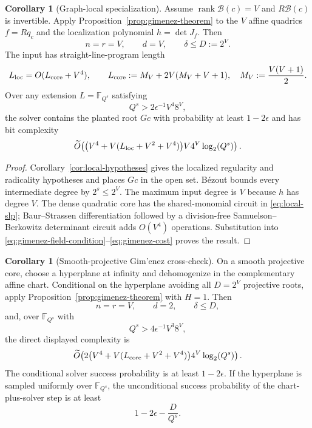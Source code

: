 \documentclass[11pt,a4paper]{article}
\theoremstyle{definition}
\newtheorem{corollary}[theorem]{Corollary}
\theoremstyle{remark}
\newcommand{\F}{\mathbb F}
\newcommand{\rank}{\operatorname{rank}}
\begin{document}
\begin{corollary}[Graph-local specialization]\label{cor:gimenez-local}
Assume $\rank\mathcal B(c)=V$ and $R\mathcal B(c)$ is invertible.  Apply Proposition~\ref{prop:gimenez-theorem} to the $V$ affine quadrics $f=Rq_c$ and the localization polynomial $h=\det J_f$.  Then
\[
 n=r=V,\qquad d=V,\qquad \delta\le D:=2^V.
\]
The input has straight-line-program length
\begin{equation}\label{eq:local-slp}
 L_{\rm loc}=O(L_{\rm core}+V^4),
 \qquad
 L_{\rm core}:=M_V+2V(M_V+V+1),
 \quad M_V:=\frac{V(V+1)}2.
\end{equation}
Over any extension $L=\F_{Q^s}$ satisfying
\begin{equation}\label{eq:local-field-condition}
 Q^s>2\epsilon^{-1}V^4 8^V,
\end{equation}
the solver contains the planted root $Gc$ with probability at least $1-2\epsilon$ and has bit complexity
\begin{equation}\label{eq:local-solver-cost}
 \widetilde O\!\left(
 \bigl(V^4+V(L_{\rm loc}+V^2+V^4)\bigr)V4^V\log_2(Q^s)
 \right).
\end{equation}
\end{corollary}

\begin{proof}
Corollary~\ref{cor:local-hypotheses} gives the localized regularity and radicality hypotheses and places $Gc$ in the open set.  B\'ezout bounds every intermediate degree by $2^s\le2^V$.  The maximum input degree is $V$ because $h$ has degree $V$.  The dense quadratic core has the shared-monomial circuit in \eqref{eq:local-slp}; Baur--Strassen differentiation followed by a division-free Samuelson--Berkowitz determinant circuit adds $O(V^4)$ operations.  Substitution into \eqref{eq:gimenez-field-condition}--\eqref{eq:gimenez-cost} proves the result.
\end{proof}

\begin{corollary}[Smooth-projective Gim'enez cross-check]\label{cor:gimenez-projective}
On a smooth projective core, choose a hyperplane at infinity and dehomogenize in the complementary affine chart.  Conditional on the hyperplane avoiding all $D=2^V$ projective roots, apply Proposition~\ref{prop:gimenez-theorem} with $H=1$.  Then
\[
 n=r=V,\qquad d=2,\qquad\delta\le D,
\]
and, over $\F_{Q^s}$ with
\begin{equation}\label{eq:projective-gimenez-field}
 Q^s>4\epsilon^{-1}V^3 8^V,
\end{equation}
the direct displayed complexity is
\begin{equation}\label{eq:projective-gimenez-cost}
 \widetilde O\!\left(
  2\bigl(V^4+V(L_{\rm core}+V^2+V^4)\bigr)4^V\log_2(Q^s)
 \right).
\end{equation}
The conditional solver success probability is at least $1-2\epsilon$.  If the hyperplane is sampled uniformly over $\F_{Q^s}$, the unconditional success probability of the chart-plus-solver step is at least
\begin{equation}\label{eq:projective-gimenez-success}
 1-2\epsilon-\frac{D}{Q^s}.
\end{equation}
\end{corollary}
\end{document}
